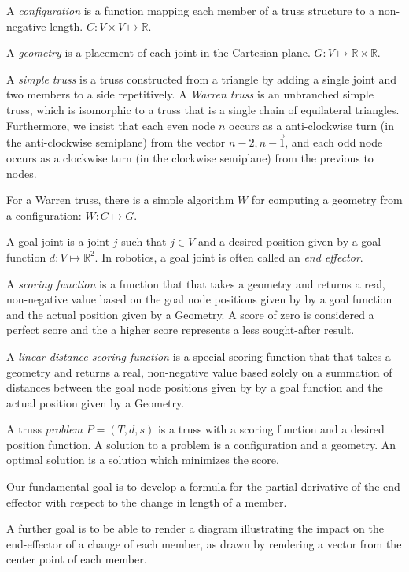 \documentclass[11pt]{article}
\begin{document}
A {\em configuration} is a function mapping each member of a truss structure to a non-negative length. $C: V \times V \mapsto \mathbb{R}$.

A {\em geometry} is a placement of each joint in the Cartesian plane. $G: V \mapsto \mathbb{R} \times \mathbb{R} $.

A {\em simple truss} is a truss constructed from a triangle by adding a single joint and two members to a side repetitively.
A {\em Warren truss} is an unbranched simple truss, which is isomorphic to a truss that is a single chain of equilateral triangles.
Furthermore, we insist that each even node $n$ occurs as a anti-clockwise turn (in the anti-clockwise semiplane) from the vector $\overrightarrow{n-2,n-1}$, and
each odd node occurs as a clockwise turn (in the clockwise semiplane) from the previous to nodes.

For a Warren truss, there is a simple algorithm $W$ for computing a geometry from a configuration: $W : C \mapsto G$.

A goal joint is a joint $j$ such that $j \in V$ and a desired position given by a goal function $d : V \mapsto \mathbb{R}^2$. In robotics,
a goal joint is often called an {\em end effector}.

A {\em scoring function} is a function that that takes a geometry and returns a real, non-negative value based on 
the goal node positions given by by a goal function and the actual position given by a Geometry. A score of zero is considered
 a perfect score and the a higher score represents a less sought-after result.

A {\em linear distance scoring function} is a special scoring function that that takes a geometry and returns a real, non-negative value based solely
on a summation of distances between the goal node positions given by by a goal function and the actual position given by a Geometry.

A truss {\em problem} $P = (T,d,s)$ is a truss with a scoring function and a desired position function.
A solution to a problem is a configuration and a geometry. An optimal solution is a solution which minimizes the score.

Our fundamental goal is to develop a formula for the partial derivative of the end effector
with respect to the change in length of a member.

A further goal is to be able to render a diagram illustrating the impact on the end-effector
of a change of each member, as drawn by rendering a vector from the center point of each member.
\end{document}
